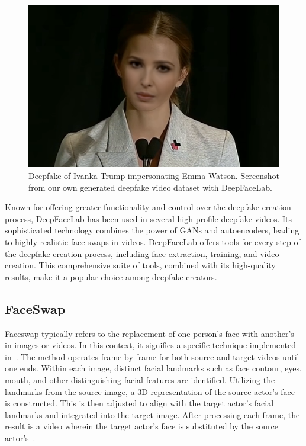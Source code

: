\begin{figure}[htpb]
	\centering
	\includegraphics[scale=0.36]{figures/ivanka-deepfacelab}
	\caption{Deepfake of Ivanka Trump impersonating Emma Watson. Screenshot
		from our own generated deepfake video dataset with DeepFaceLab.}
\end{figure}

Known for offering greater functionality and control over the deepfake creation
process, DeepFaceLab has been used in several high-profile deepfake videos.
Its sophisticated technology combines the power of \ac{GAN}s and autoencoders,
leading to highly realistic face swaps in videos. DeepFaceLab offers tools
for every step of the deepfake creation process, including face extraction,
training, and video creation. This comprehensive suite of tools, combined
with its high-quality results, make it a popular choice among deepfake creators.

\subsection{FaceSwap}\label{sec:faceswap}
Faceswap typically refers to the replacement of one person's face with another's
in images or videos. In this context, it signifies a specific technique
implemented in~\cite{faceswap}. The method operates frame-by-frame for both
source and target videos until one ends. Within each image, distinct
facial landmarks such as face contour, eyes, mouth, and other distinguishing
facial features are identified. Utilizing the landmarks from the source image,
a 3D representation of the source actor's face is constructed. This is then
adjusted to align with the target actor's facial landmarks and integrated
into the target image. After processing each frame, the result is a video
wherein the target actor's face is substituted by the source
actor's~\cite{deepfakes-thesis,9897972,Korshunova_2017_ICCV}.

